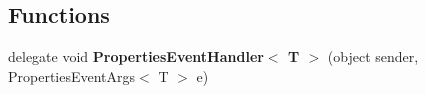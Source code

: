 \subsection*{Functions}
\begin{DoxyCompactItemize}
\item 
\hypertarget{namespacelib_watcher_dialog_1_1_property_item_a47d87731e4ab40188cd157944b667726}{delegate void {\bfseries Properties\+Event\+Handler$<$ T $>$} (object sender, Properties\+Event\+Args$<$ T $>$ e)}\label{namespacelib_watcher_dialog_1_1_property_item_a47d87731e4ab40188cd157944b667726}

\end{DoxyCompactItemize}
